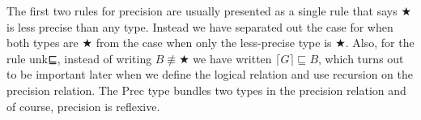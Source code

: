 The first two rules for precision are usually presented as a single
rule that says ★ is less precise than any type.  Instead we have
separated out the case for when both types are ★ from the case when
only the less-precise type is ★.  Also, for the rule \textsf{unk⊑},
instead of writing $B ≢ ★$ we have written $⌈ G ⌉ ⊑ B$, which turns
out to be important later when we define the logical relation and use
recursion on the precision relation.
%
The \textsf{Prec} type bundles two types in the precision relation and
of course, precision is reflexive.

\begin{code}%
\>[0]\AgdaSpace{}%
\AgdaSymbol{:}\AgdaSpace{}%
\<%
\\
\>[0]\AgdaSpace{}%
\AgdaSymbol{=}\AgdaSpace{}%
\AgdaSymbol{(}\AgdaFunction{∃[}\AgdaSpace{}%
\AgdaSpace{}%
\AgdaFunction{]}\AgdaSpace{}%
\AgdaFunction{∃[}\AgdaSpace{}%
\AgdaSpace{}%
\AgdaFunction{]}\AgdaSpace{}%
\AgdaSpace{}%
\AgdaSpace{}%
\AgdaSymbol{)}\<%
\\
%
\\[\AgdaEmptyExtraSkip]%
\>[0]\AgdaSpace{}%
\AgdaSymbol{:}\AgdaSpace{}%
\AgdaSymbol{\}}\AgdaSpace{}%
\AgdaSpace{}%
\AgdaSpace{}%
\AgdaSpace{}%
\<%
\end{code}
\begin{code}[hide]%
\>[0]\AgdaSpace{}%
\AgdaSymbol{\{}\AgdaSymbol{\}}\AgdaSpace{}%
\AgdaSymbol{=}\AgdaSpace{}%
\<%
\\
\>[0]\AgdaSpace{}%
\AgdaSymbol{\{}\AgdaSpace{}%
\AgdaSymbol{\}}\AgdaSpace{}%
\AgdaSymbol{=}\AgdaSpace{}%
\<%
\\
\>[0]\AgdaSpace{}%
\AgdaSymbol{\{}\AgdaSpace{}%
\AgdaSpace{}%
\AgdaSymbol{\}}\AgdaSpace{}%
\AgdaSymbol{=}\AgdaSpace{}%
\AgdaSpace{}%
\AgdaSpace{}%
\<%
\end{code}


